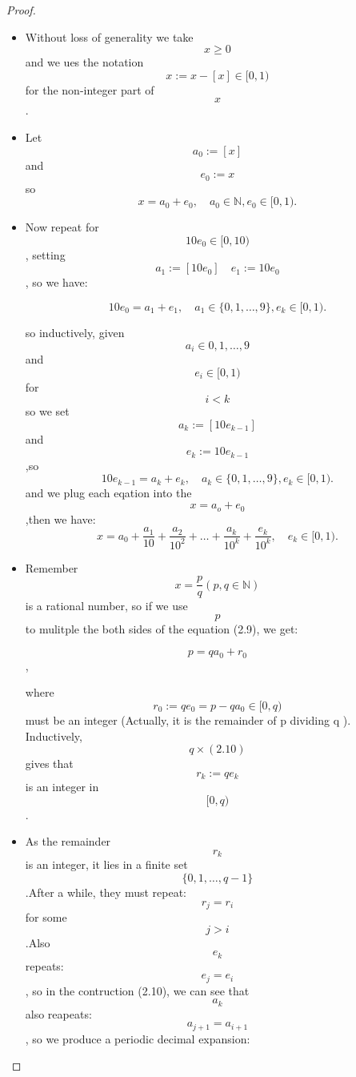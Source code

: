 \documentclass[a4paper]{article}
\begin{document}
\begin{proof}
    \begin{itemize}
        \item Without loss of generality we take $$x\geq 0$$ and we ues the notation $${x}:=x-[x]\in [0,1)$$ for the non-integer part of $$x$$.
        \item Let $$a_0:=[x]$$ and $$e_0:={x}$$ so 
            \begin{equation}
            x=a_0+e_0, \quad a_0 \in \mathbb{N},e_0\in [0,1). \tag{2.9}
            \end{equation}
        \item  
            Now repeat for $$10e_0 \in [0,10)$$, setting $$a_1:=[10e_0] \quad e_1:={10e_0}$$, so we have:
            \begin{center}
            $$10e_0=a_1+e_1, \quad a_1\in \{0,1,\ldots,9\},e_k\in [0,1).$$
            \end{center} 
            so inductively, given $$a_i \in {0,1,\ldots,9}$$ and $$e_i\in [0,1)$$ for $$i<k$$ so we set $$a_k:=[10e_{k-1}]$$ and $$e_k:={10e_{k-1}}$$,so
            \begin{equation}
            10e_{k-1}=a_k+e_k, \quad  a_k\in \{0,1,\ldots,9\},e_k\in [0,1). \tag{2.10}
            \end{equation}
            and we plug each eqation into the $$x=a_o+e_0$$,then we have:
            \begin{equation}
                x=a_0+\frac{a_1}{10}+\frac{a_2}{10^2}+\ldots+\frac{a_k}{10^k}+\frac{e_k}{10^k},\quad e_k\in[0,1).\tag{2.11}
            \end{equation}
        \item Remember $$x=\frac{p}{q}(p,q\in \mathbb{N})$$ is a rational number, so if we use $$p$$ to mulitple the both sides of the equation (2.9), we get:
            \begin{center}  
                $$p=qa_0+r_0$$,
            \end{center}
        where $$r_0:=qe_0=p-qa_0\in [0,q)$$ must be an integer (Actually, it is the remainder of p dividing q ). Inductively, $$q\times (2.10)$$ gives that $$r_k:=qe_k$$ is an integer in $$[0,q)$$.
        \item As the remainder $$r_k$$ is an integer, it lies in a finite set $$\{0,1,\ldots,q-1\}$$.After a while, they must repeat:$$r_j=r_i$$ for some $$j>i$$.Also $$e_k$$ repeats: $$e_j=e_i$$, so in the contruction (2.10), we can see that $$a_k$$ also reapeats:$$a_{j+1}=a_{i+1}$$, so we produce a periodic decimal expansion:

\end{itemize}
\end{proof}
\end{document}
